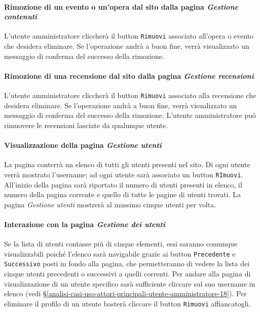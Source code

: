 \paragraph{Rimozione di un evento o un'opera dal sito dalla pagina \textit{Gestione contenuti}}
\label{analisi-casi-uso-attori-principali-utente-amministratore-14}
L'utente amministratore cliccherà il button \texttt{Rimuovi} associato all'opera o evento che desidera eliminare. Se l'operazione andrà a buon fine, verrà visualizzato un messaggio di conferma del successo della rimozione.


\paragraph{Rimozione di una recensione dal sito dalla pagina \textit{Gestione recensioni}}
\label{analisi-casi-uso-attori-principali-utente-amministratore-15}
L'utente amministratore cliccherà il button \texttt{Rimuovi} associato alla recensione che desidera eliminare. Se l'operazione andrà a buon fine, verrà visualizzato un messaggio di conferma del successo della rimozione. L'utente amministratore può rimuovere le recensioni lasciate da qualunque utente.


\paragraph{Visualizzazione della pagina \textit{Gestione utenti}}
\label{analisi-casi-uso-attori-principali-utente-amministratore-16}
La pagina conterrà un elenco di tutti gli utenti presenti nel sito. Di ogni utente verrà mostrato l'username; ad ogni utente sarà associato un button \texttt{RImuovi}. All'inizio della pagina sarà riportato il numero di utenti presenti in elenco, il numero della pagina corrente e quello di tutte le pagine di utenti trovati. La pagina \textit{Gestione utenti} mostrerà al massimo cinque utenti per volta.


\paragraph{Interazione con la pagina \textit{Gestione dei utenti}}
\label{analisi-casi-uso-attori-principali-utente-amministratore-17}
Se la lista di utenti contasse più di cinque elementi, essi saranno comunque visualizzabili poiché l'elenco sarà navigabile grazie ai button \texttt{Precedente} e \texttt{Successivo} posti in fondo alla pagina, che permetteranno di vedere la lista dei cinque utenti precedenti o successivi a quelli correnti. Per andare alla pagina di visualizzazione di un utente specifico sarà sufficiente cliccare sul suo username in elenco (vedi §\ref{analisi-casi-uso-attori-principali-utente-amministratore-18}). Per eliminare il profilo di un utente basterà cliccare il button \texttt{Rimuovi} affiancatogli.


